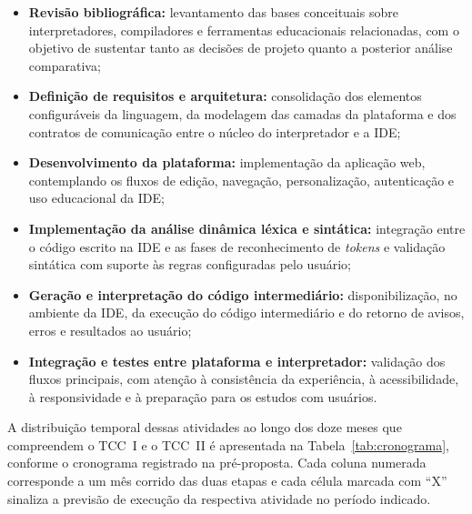 \begin{itemize}
    \item \textbf{Revisão bibliográfica:} levantamento das bases conceituais sobre interpretadores, compiladores e ferramentas educacionais relacionadas, com o objetivo de sustentar tanto as decisões de projeto quanto a posterior análise comparativa;
    \item \textbf{Definição de requisitos e arquitetura:} consolidação dos elementos configuráveis da linguagem, da modelagem das camadas da plataforma e dos contratos de comunicação entre o núcleo do interpretador e a IDE;
    \item \textbf{Desenvolvimento da plataforma:} implementação da aplicação web, contemplando os fluxos de edição, navegação, personalização, autenticação e uso educacional da IDE;
    \item \textbf{Implementação da análise dinâmica léxica e sintática:} integração entre o código escrito na IDE e as fases de reconhecimento de \textit{tokens} e validação sintática com suporte às regras configuradas pelo usuário;
    \item \textbf{Geração e interpretação do código intermediário:} disponibilização, no ambiente da IDE, da execução do código intermediário e do retorno de avisos, erros e resultados ao usuário;
    \item \textbf{Integração e testes entre plataforma e interpretador:} validação dos fluxos principais, com atenção à consistência da experiência, à acessibilidade, à responsividade e à preparação para os estudos com usuários.
\end{itemize}

A distribuição temporal dessas atividades ao longo dos doze meses que compreendem o TCC~I e o TCC~II é apresentada na Tabela~\ref{tab:cronograma}, conforme o cronograma registrado na pré-proposta. Cada coluna numerada corresponde a um mês corrido das duas etapas e cada célula marcada com ``X'' sinaliza a previsão de execução da respectiva atividade no período indicado.

